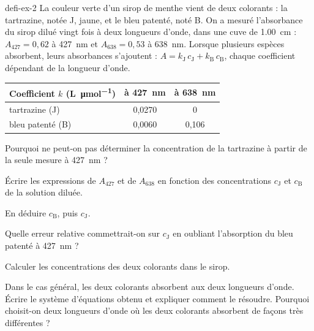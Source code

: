 \begin{blocEdition}{defi-ex-2}
La couleur verte d'un sirop de menthe vient de deux colorants : la tartrazine, notée J, jaune, et le bleu patenté,
noté B. On a mesuré l'absorbance du sirop dilué vingt fois à deux longueurs d'onde, dans une cuve de \qty{1,00}{cm} :
$A_{427}=0{,}62$ à \qty{427}{nm} et $A_{638}=0{,}53$ à \qty{638}{nm}. Lorsque plusieurs espèces absorbent, leurs absorbances s'ajoutent :
$A=k_\mathrm{J}\,c_\mathrm{J}+k_\mathrm{B}\,c_\mathrm{B}$, chaque coefficient dépendant de la longueur d'onde.
\begin{center}
\begin{tabular}{lcc}
\toprule
Coefficient $k$ (\unit{L.\micro mol^{-1}}) & à \qty{427}{nm} & à \qty{638}{nm} \\
\midrule
tartrazine (J) & 0,0270 & 0 \\
bleu patenté (B) & 0,0060 & 0,106 \\
\bottomrule
\end{tabular}
\end{center}
\begin{questions}
\item Pourquoi ne peut-on pas déterminer la concentration de la tartrazine à partir de la seule mesure à \qty{427}{nm} ?
\item Écrire les expressions de $A_{427}$ et de $A_{638}$ en fonction des concentrations $c_\mathrm{J}$ et $c_\mathrm{B}$ de la solution diluée.
\item En déduire $c_\mathrm{B}$, puis $c_\mathrm{J}$.
\item Quelle erreur relative commettrait-on sur $c_\mathrm{J}$ en oubliant l'absorption du bleu patenté à \qty{427}{nm} ?
\item Calculer les concentrations des deux colorants dans le sirop.
\item Dans le cas général, les deux colorants absorbent aux deux longueurs d'onde. Écrire le système d'équations obtenu et
expliquer comment le résoudre. Pourquoi choisit-on deux longueurs d'onde où les deux colorants absorbent de façons très
différentes ?
\end{questions}
\end{blocEdition}

